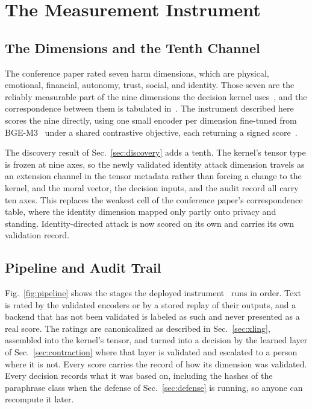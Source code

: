 \documentclass[journal]{IEEEtran}
\begin{document}
\section{The Measurement Instrument}
\label{sec:instrument}

\subsection{The Dimensions and the Tenth Channel}

The conference paper rated seven harm dimensions, which are physical,
emotional, financial, autonomy, trust, social, and identity. Those seven are
the reliably measurable part of the nine dimensions the decision kernel
uses~\cite{erisml_compiler}, and the correspondence between them is tabulated
in~\cite{bond2026bds}. The instrument described here scores the nine
directly, using one small encoder per dimension fine-tuned from
BGE-M3~\cite{chen2024bge} under a shared contrastive objective, each
returning a signed score~\cite{xbse}.

The discovery result of Sec.~\ref{sec:discovery} adds a tenth. The kernel's
tensor type is frozen at nine axes, so the newly validated identity attack
dimension travels as an extension channel in the tensor metadata rather than
forcing a change to the kernel, and the moral vector, the decision inputs,
and the audit record all carry ten axes. This replaces the weakest cell of
the conference paper's correspondence table, where the identity dimension
mapped only partly onto privacy and standing. Identity-directed attack is now
scored on its own and carries its own validation record.

\subsection{Pipeline and Audit Trail}

Fig.~\ref{fig:pipeline} shows the stages the deployed
instrument~\cite{msa} runs in order. Text is rated by the validated encoders
or by a stored replay of their outputs, and a backend that has not been
validated is labeled as such and never presented as a real score. The ratings
are canonicalized as described in Sec.~\ref{sec:xling}, assembled into the
kernel's tensor, and turned into a decision by the learned layer of
Sec.~\ref{sec:contraction} where that layer is validated and escalated to a
person where it is not. Every score carries the record of how its dimension
was validated. Every decision records what it was based on, including the
hashes of the paraphrase class when the defense of Sec.~\ref{sec:defense} is
running, so anyone can recompute it later.
\end{document}
